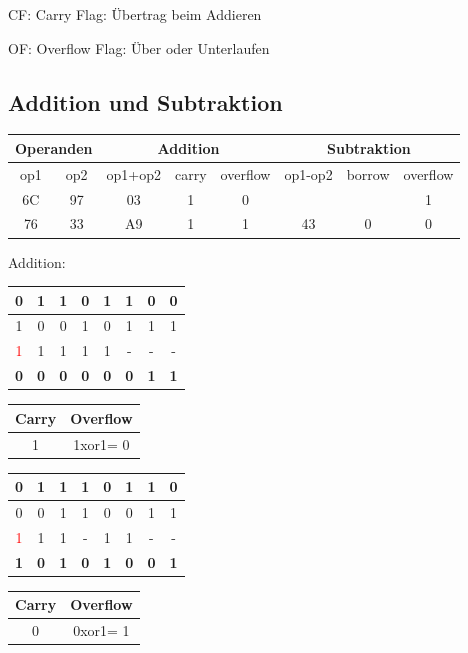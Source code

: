 CF: Carry Flag: Übertrag beim Addieren

OF: Overflow Flag: Über oder Unterlaufen


\subsection*{Addition und Subtraktion}

\begin{tabular}{|c|c|c|c|c|c|c|c|}
\hline 
\multicolumn{2}{|c|}{Operanden} & \multicolumn{3}{c|}{Addition} & \multicolumn{3}{c|}{Subtraktion}\tabularnewline
\hline 
\hline 
op1 & op2 & op1+op2 & carry & overflow & op1-op2 & borrow & overflow\tabularnewline
\hline 
6C & 97 & 03 & 1 & 0 &  &  & 1\tabularnewline
\hline 
76 & 33 & A9 & 1 & 1 & 43 & 0 & 0\tabularnewline
\hline 
\end{tabular}

Addition: %
\begin{tabular}{|c|c|c|c|c|c|c|c|}
\hline 
0 & 1 & 1 & 0 & 1 & 1 & 0 & 0\tabularnewline
\hline 
1 & 0 & 0 & 1 & 0 & 1 & 1 & 1\tabularnewline
\hline 
\hline 
\textcolor{red}{1} & 1 & 1 & 1 & 1 & - & - & -\tabularnewline
\hline 
\hline 
\textbf{0} & \textbf{0} & \textbf{0} & \textbf{0} & \textbf{0} & \textbf{0} & \textbf{1} & \textbf{1}\tabularnewline
\hline 
\end{tabular}%
\begin{tabular}{|c|c|}
\hline 
\textbf{Carry} & \textbf{Overflow}\tabularnewline
\hline 
\hline 
1 & 1xor1= 0\tabularnewline
\hline 
\end{tabular}%
\begin{tabular}{|c|c|c|c|c|c|c|c|}
\hline 
0 & 1 & 1 & 1 & 0 & 1 & 1 & 0\tabularnewline
\hline 
0 & 0 & 1 & 1 & 0 & 0 & 1 & 1\tabularnewline
\hline 
\hline 
\textcolor{red}{1} & 1 & 1 & - & 1 & 1 & - & -\tabularnewline
\hline 
\hline 
\textbf{1} & \textbf{0} & \textbf{1} & \textbf{0} & \textbf{1} & \textbf{0} & \textbf{0} & \textbf{1}\tabularnewline
\hline 
\end{tabular}%
\begin{tabular}{|c|c|}
\hline 
\textbf{Carry} & \textbf{Overflow}\tabularnewline
\hline 
\hline 
0 & 0xor1= 1\tabularnewline
\hline 
\end{tabular}


